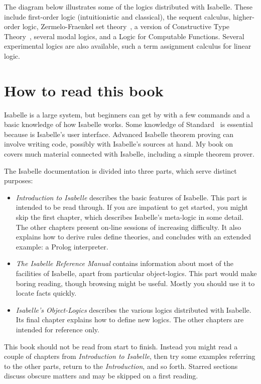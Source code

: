 The diagram below illustrates some of the logics distributed with Isabelle.
These include first-order logic (intuitionistic and classical), the sequent
calculus, higher-order logic, Zermelo-Fraenkel set theory~\cite{suppes72},
a version of Constructive Type Theory~\cite{nordstrom90}, several modal
logics, and a Logic for Computable Functions.  Several experimental
logics are also available, such a term assignment calculus for linear
logic.  

\centerline{}


\section*{How to read this book}
Isabelle is a large system, but beginners can get by with a few commands
and a basic knowledge of how Isabelle works.  Some knowledge of
Standard~\ML{} is essential because \ML{} is Isabelle's user interface.
Advanced Isabelle theorem proving can involve writing \ML{} code, possibly
with Isabelle's sources at hand.  My book on~\ML{}~\cite{paulson91} covers
much material connected with Isabelle, including a simple theorem prover.

The Isabelle documentation is divided into three parts, which serve
distinct purposes:
\begin{itemize}
\item {\em Introduction to Isabelle\/} describes the basic features of
  Isabelle.  This part is intended to be read through.  If you are
  impatient to get started, you might skip the first chapter, which
  describes Isabelle's meta-logic in some detail.  The other chapters
  present on-line sessions of increasing difficulty.  It also explains how
  to derive rules define theories, and concludes with an extended example:
  a Prolog interpreter.

\item {\em The Isabelle Reference Manual\/} contains information about most
  of the facilities of Isabelle, apart from particular object-logics.  This
  part would make boring reading, though browsing might be useful.  Mostly
  you should use it to locate facts quickly.

\item {\em Isabelle's Object-Logics\/} describes the various logics
  distributed with Isabelle.  Its final chapter explains how to define new
  logics.  The other chapters are intended for reference only.
\end{itemize}
This book should not be read from start to finish.  Instead you might read
a couple of chapters from {\em Introduction to Isabelle}, then try some
examples referring to the other parts, return to the {\em Introduction},
and so forth.  Starred sections discuss obscure matters and may be skipped
on a first reading.



